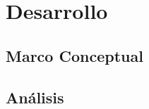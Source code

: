 
\section{Desarrollo}

\lipsum[3-4]

\subsection{Marco Conceptual}

\lipsum[5]



\subsection{Análisis}

\lipsum[6]
